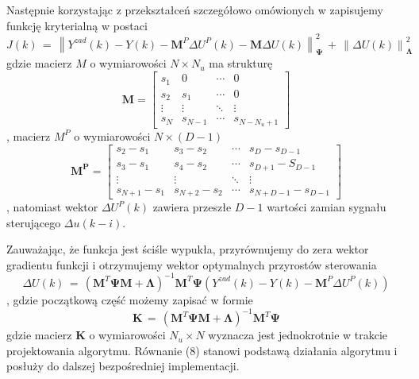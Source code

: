 \par Następnie korzystając z przekształceń szczegółowo omówionych w \cite{stp2009} zapisujemy funkcję kryterialną w postaci
\begin{equation}
J(k) \, = \, \left\| Y^{zad}(k) - Y(k) - \bm{M}^P \Delta U^P(k) - \bm{M} \Delta U(k) \right\|_{\bm{\Psi}}^2 \,+ \,
\left\| \Delta U(k) \right\|_{\bm{\Lambda}}^2
\end{equation}
gdzie macierz \(M \) o wymiarowości \( N \times N_u \) ma strukturę
\begin{equation}
\bm{M} = 
	\begin{bmatrix}
		s_1 & 0 & \cdots & 0 \\
		s_2 & s_1 & \cdots & 0 \\
		\vdots & \vdots & \ddots & \vdots \\
		s_N & s_{N-1} & \cdots & s_{N-N_u+1}
	\end{bmatrix}
\end{equation}, 
macierz \(M^P \) o wymiarowości \( N \times (D-1) \) 
\begin{equation}
\bm{M^P} = 
	\begin{bmatrix}
		s_2 - s_1 & s_3 - s_2 & \cdots & s_D - s_{D-1} \\
		s_3 - s_1 & s_4 - s_2 & \cdots & s_{D+1} - S_{D-1}  \\
		\vdots & \vdots & \ddots & \vdots \\
		s_{N+1} - s_1 & s_{N+2} - s_2 & \cdots & s_{N+D-1} - s_{D-1}
	\end{bmatrix}
\end{equation}, 
natomiast wektor \( \Delta U^P(k) \) zawiera przeszłe \(D-1\) wartości zamian sygnału sterującego \(\Delta u(k-i)\). 

\par Zauważając, że funkcja jest ściśle wypukła, przyrównujemy do zera wektor gradientu funkcji i otrzymujemy wektor optymalnych przyrostów sterowania
\begin{equation}
\Delta U(k) \, = \, (\bm{M}^T\bm{\Psi}\bm{M}+\bm{\Lambda})^{-1}\bm{M}^T\bm{\Psi}(Y^{zad}(k) - Y(k) - \bm{M}^P \Delta U^P(k))
\end{equation}, 
gdzie początkową część możemy zapisać w formie 
\begin{equation}
\bm{K} \, = \, (\bm{M}^T\bm{\Psi}\bm{M}+\bm{\Lambda})^{-1}\bm{M}^T\bm{\Psi}
\end{equation}
gdzie macierz \( \bm{K}\) o wymiarowości \( N_u \times N \) wyznacza jest jednokrotnie w trakcie projektowania algorytmu. Równanie (8) stanowi podstawą działania algorytmu i posłuży do dalszej bezpośredniej implementacji.

